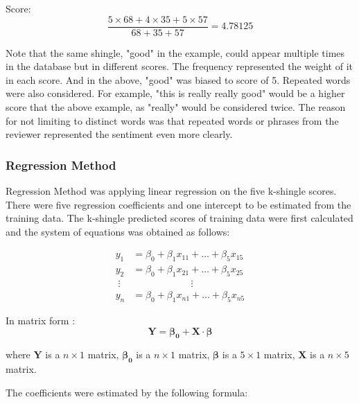 Score:
\begin{displaymath}
\frac{5 \times 68 + 4 \times 35 + 5 \times 57}{68 + 35 + 57} = 4.78125
\end{displaymath}

Note that the same shingle, "good" in the example, could appear multiple times in the database but in different scores.
The frequency represented the weight of it in each score. And in the above, "good" was biased to score of 5.
Repeated words were also considered. For example, "this is really really good" would be a higher score that the above example, as "really" would be considered twice.
The reason for not limiting to distinct words was that repeated words or phrases from the reviewer represented the sentiment even more clearly.

\subsubsection{Regression Method}
Regression Method was applying linear regression on the five k-shingle scores. 
There were five regression coefficients and one intercept to be estimated from the training data. The k-shingle predicted scores of training data were first calculated and the system of equations was obtained as follows:

\begin{displaymath}
\begin{alignedat}{4}
y_1 &= \beta_0  + \beta_1 x_{11} + \dots + \beta_5 x_{15}\\
y_2 &= \beta_0 + \beta_1 x_{21} + \dots + \beta_5 x_{25}\\
\;\vdots  &            \qquad\qquad\qquad\vdots \\
y_n &= \beta_0 + \beta_1 x_{n1} + \dots + \beta_5 x_{n5}
\end{alignedat}
\end{displaymath}

In matrix form :
\begin{displaymath}
\textbf{Y}= \boldsymbol{\beta_0}+\textbf{X} \cdot \boldsymbol{\beta}
\end{displaymath}

\raggedright
where \(\textbf{Y}\) is a \(n\times1\) matrix, \(\boldsymbol{\beta_0}\) is a \(n\times 1\) matrix, \(\boldsymbol{\beta}\) is a \(5\times 1\) matrix, \(\textbf{X}\) is a \(n\times 5\) matrix.


The coefficients were estimated by the following formula: \\

